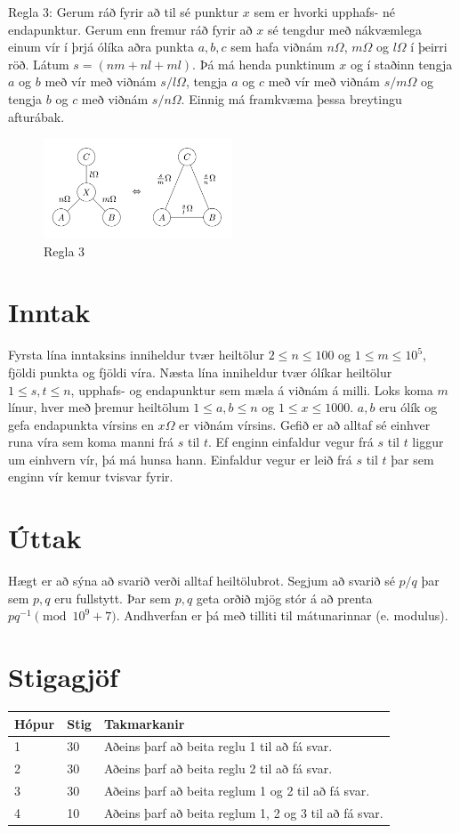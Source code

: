 Regla 3: Gerum ráð fyrir að til sé punktur $x$ sem er hvorki upphafs- né endapunktur. Gerum enn fremur ráð fyrir að $x$ sé tengdur með nákvæmlega einum vír í þrjá ólíka aðra punkta $a, b, c$ sem hafa viðnám
$n \Omega$, $m \Omega$ og $l \Omega$ í þeirri röð. Látum $s = (nm + nl + ml)$. Þá má henda punktinum $x$ og í staðinn tengja $a$ og $b$ með vír með viðnám $s/l \Omega$, tengja $a$ og $c$ með vír með viðnám
$s/m \Omega$ og tengja $b$ og $c$ með viðnám $s/n \Omega$. Einnig má framkvæma þessa breytingu afturábak.

\begin{figure}[h!]
  \centering
    \includegraphics[width=0.5\textwidth]{regla3}
  \caption{Regla 3}
\end{figure}

\section*{Inntak}
Fyrsta lína inntaksins inniheldur tvær heiltölur $2 \leq n \leq 100$ og $1 \leq m \leq 10^5$, fjöldi punkta og fjöldi víra.
Næsta lína inniheldur tvær ólíkar heiltölur $1 \leq s, t \leq n$, upphafs- og endapunktur sem mæla á viðnám á milli.
Loks koma $m$ línur, hver með þremur heiltölum $1 \leq a, b \leq n$ og $1 \leq x \leq 1000$. $a, b$ eru ólík og gefa endapunkta vírsins en $x \Omega$ er viðnám vírsins.
Gefið er að alltaf sé einhver runa víra sem koma manni frá $s$ til $t$. Ef enginn einfaldur vegur frá $s$ til $t$ liggur um einhvern vír, þá má hunsa hann. Einfaldur vegur er leið frá $s$ til $t$ þar sem enginn vír kemur tvisvar fyrir.

\section*{Úttak}
Hægt er að sýna að svarið verði alltaf heiltölubrot. Segjum að svarið sé $p/q$ þar sem $p, q$ eru fullstytt. Þar sem $p, q$ geta orðið mjög stór á að prenta $pq^{-1} \pmod{10^9 + 7}$. Andhverfan 
er þá með tilliti til mátunarinnar (e. modulus).

\section*{Stigagjöf}
\begin{tabular}{|l|l|l|}
\hline
Hópur & Stig & Takmarkanir \\ \hline
1     & 30   & Aðeins þarf að beita reglu 1 til að fá svar. \\ \hline
2     & 30   & Aðeins þarf að beita reglu 2 til að fá svar. \\ \hline
3     & 30   & Aðeins þarf að beita reglum 1 og 2 til að fá svar. \\ \hline
4     & 10   & Aðeins þarf að beita reglum 1, 2 og 3 til að fá svar. \\ \hline
\end{tabular}

